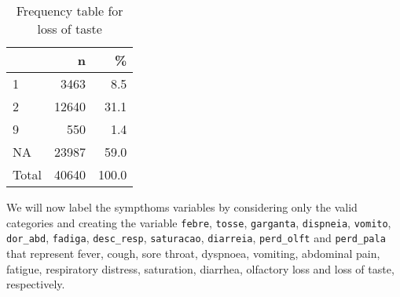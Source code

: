 \documentclass[
]{article}
\newenvironment{Shaded}{\begin{snugshade}}{\end{snugshade}}
\newcommand{\CommentTok}[1]{\textcolor[rgb]{0.56,0.35,0.01}{\textit{#1}}}
\newcommand{\DataTypeTok}[1]{\textcolor[rgb]{0.13,0.29,0.53}{#1}}
\newcommand{\DecValTok}[1]{\textcolor[rgb]{0.00,0.00,0.81}{#1}}
\newcommand{\KeywordTok}[1]{\textcolor[rgb]{0.13,0.29,0.53}{\textbf{#1}}}
\newcommand{\NormalTok}[1]{#1}
\newcommand{\OperatorTok}[1]{\textcolor[rgb]{0.81,0.36,0.00}{\textbf{#1}}}
\newcommand{\OtherTok}[1]{\textcolor[rgb]{0.56,0.35,0.01}{#1}}
\newcommand{\StringTok}[1]{\textcolor[rgb]{0.31,0.60,0.02}{#1}}
\begin{document}
\begin{Shaded}
\end{Shaded}

\begin{table}[!h]

\caption{\label{tab:unnamed-chunk-66}Frequency table for loss of taste}
\centering
\begin{tabular}[t]{l|r|r}
\hline
  & n & \%\\
\hline
1 & 3463 & 8.5\\
\hline
2 & 12640 & 31.1\\
\hline
9 & 550 & 1.4\\
\hline
NA & 23987 & 59.0\\
\hline
Total & 40640 & 100.0\\
\hline
\end{tabular}
\end{table}

We will now label the sympthoms variables by considering only the valid
categories and creating the variable \texttt{febre}, \texttt{tosse},
\texttt{garganta}, \texttt{dispneia}, \texttt{vomito},
\texttt{dor\_abd}, \texttt{fadiga}, \texttt{desc\_resp},
\texttt{saturacao}, \texttt{diarreia}, \texttt{perd\_olft} and
\texttt{perd\_pala} that represent fever, cough, sore throat, dyspnoea,
vomiting, abdominal pain, fatigue, respiratory distress, saturation,
diarrhea, olfactory loss and loss of taste, respectively.

\begin{Shaded}
\end{Shaded}
\end{document}
